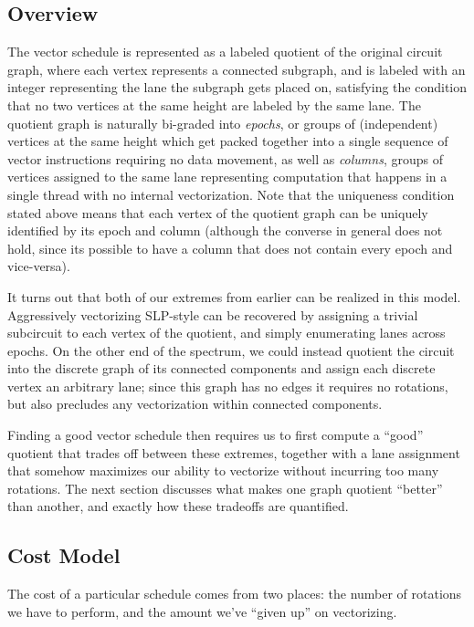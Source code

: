 \subsection{Overview}
The vector schedule  is represented as a labeled quotient of the original circuit graph, where each vertex represents a connected subgraph, and is labeled with an integer representing the lane the subgraph gets placed on, satisfying the condition that no two vertices at the same height are labeled by the same lane.
The quotient graph is naturally bi-graded into {\em epochs}, or groups of (independent) vertices at the same height which get packed together into a single sequence of vector instructions requiring no data movement, as well as {\em columns}, groups of vertices assigned to the same lane representing computation that happens in a single thread with no internal vectorization.
Note that the uniqueness condition stated above means that each vertex of the quotient graph can be uniquely identified by its epoch and column (although the converse in general does not hold, since its possible to have a column that does not contain every epoch and vice-versa).

It turns out that both of our extremes from earlier can be realized in this model.
Aggressively vectorizing SLP-style can be recovered by assigning a trivial subcircuit to each vertex of the quotient, and simply enumerating lanes across epochs.
On the other end of the spectrum, we could instead quotient the circuit into the discrete graph of its connected components and assign each discrete vertex an arbitrary lane; since this graph has no edges it requires no rotations, but also precludes any vectorization within connected components.

Finding a good vector schedule then requires us to first compute a ``good'' quotient that trades off between these extremes, together with a lane assignment that somehow maximizes our ability to vectorize without incurring too many rotations.
The next section discusses what makes one graph quotient ``better'' than another, and exactly how these tradeoffs are quantified.

\subsection{Cost Model}\label{sec:cost-model}
The cost of a particular schedule comes from two places: the number of rotations we have to perform, and the amount we've ``given up'' on vectorizing.
